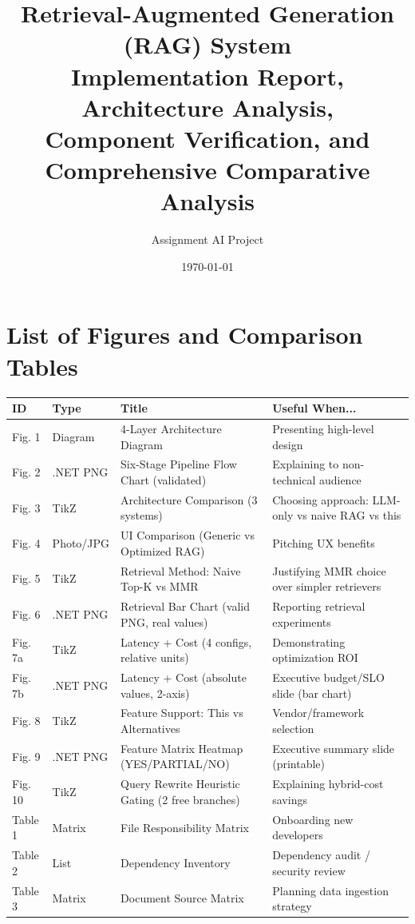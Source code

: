 \documentclass[12pt,a4paper]{article}
\title{
    \textbf{Retrieval-Augmented Generation (RAG) System} \\
    \large Implementation Report, Architecture Analysis, \\
    Component Verification, and Comprehensive Comparative Analysis
}
\author{Assignment AI Project}
\date{\today}
\begin{document}
\maketitle
\tableofcontents
\newpage

\section{List of Figures and Comparison Tables}
\vspace{-0.3cm}
\begin{table}[H]
\centering
\footnotesize
\begin{tabular}{@{}lllp{4cm}@{}}
\toprule
\textbf{ID} & \textbf{Type} & \textbf{Title} & \textbf{Useful When...} \\
\midrule
Fig. 1 & Diagram & 4-Layer Architecture Diagram & Presenting high-level design \\
Fig. 2 & .NET PNG & Six-Stage Pipeline Flow Chart (validated) & Explaining to non-technical audience \\
Fig. 3 & TikZ & Architecture Comparison (3 systems) & Choosing approach: LLM-only vs naive RAG vs this \\
Fig. 4 & Photo/JPG & UI Comparison (Generic vs Optimized RAG) & Pitching UX benefits \\
Fig. 5 & TikZ & Retrieval Method: Naive Top-K vs MMR & Justifying MMR choice over simpler retrievers \\
Fig. 6 & .NET PNG & Retrieval Bar Chart (valid PNG, real values) & Reporting retrieval experiments \\
Fig. 7a & TikZ & Latency + Cost (4 configs, relative units) & Demonstrating optimization ROI \\
Fig. 7b & .NET PNG & Latency + Cost (absolute values, 2-axis) & Executive budget/SLO slide (bar chart) \\
Fig. 8 & TikZ & Feature Support: This vs Alternatives & Vendor/framework selection \\
Fig. 9 & .NET PNG & Feature Matrix Heatmap (YES/PARTIAL/NO) & Executive summary slide (printable) \\
Fig. 10 & TikZ & Query Rewrite Heuristic Gating (2 free branches) & Explaining hybrid-cost savings \\
\midrule
Table 1 & Matrix & File Responsibility Matrix & Onboarding new developers \\
Table 2 & List & Dependency Inventory & Dependency audit / security review \\
Table 3 & Matrix & Document Source Matrix & Planning data ingestion strategy \\

\end{tabular}
\end{table}
\end{document}
